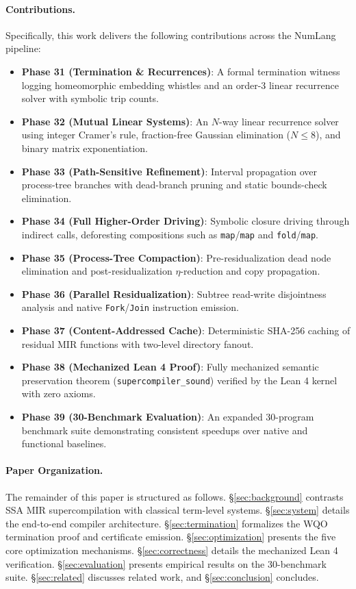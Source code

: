 \paragraph{Contributions.}
Specifically, this work delivers the following contributions across the NumLang pipeline:
\begin{itemize}
    \item \textbf{Phase 31 (Termination & Recurrences)}: A formal termination witness logging homeomorphic embedding whistles and an order-3 linear recurrence solver with symbolic trip counts.
    \item \textbf{Phase 32 (Mutual Linear Systems)}: An $N$-way linear recurrence solver using integer Cramer's rule, fraction-free Gaussian elimination ($N \le 8$), and binary matrix exponentiation.
    \item \textbf{Phase 33 (Path-Sensitive Refinement)}: Interval propagation over process-tree branches with dead-branch pruning and static bounds-check elimination.
    \item \textbf{Phase 34 (Full Higher-Order Driving)}: Symbolic closure driving through indirect calls, deforesting compositions such as \texttt{map}/\texttt{map} and \texttt{fold}/\texttt{map}.
    \item \textbf{Phase 35 (Process-Tree Compaction)}: Pre-residualization dead node elimination and post-residualization $\eta$-reduction and copy propagation.
    \item \textbf{Phase 36 (Parallel Residualization)}: Subtree read-write disjointness analysis and native \texttt{Fork}/\texttt{Join} instruction emission.
    \item \textbf{Phase 37 (Content-Addressed Cache)}: Deterministic SHA-256 caching of residual MIR functions with two-level directory fanout.
    \item \textbf{Phase 38 (Mechanized Lean 4 Proof)}: Fully mechanized semantic preservation theorem (\texttt{supercompiler\_sound}) verified by the Lean 4 kernel with zero axioms.
    \item \textbf{Phase 39 (30-Benchmark Evaluation)}: An expanded 30-program benchmark suite demonstrating consistent speedups over native and functional baselines.
\end{itemize}

\paragraph{Paper Organization.}
The remainder of this paper is structured as follows. \S\ref{sec:background} contrasts SSA MIR supercompilation with classical term-level systems. \S\ref{sec:system} details the end-to-end compiler architecture. \S\ref{sec:termination} formalizes the WQO termination proof and certificate emission. \S\ref{sec:optimization} presents the five core optimization mechanisms. \S\ref{sec:correctness} details the mechanized Lean 4 verification. \S\ref{sec:evaluation} presents empirical results on the 30-benchmark suite. \S\ref{sec:related} discusses related work, and \S\ref{sec:conclusion} concludes.
